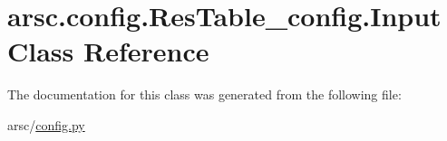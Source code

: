 \hypertarget{classarsc_1_1config_1_1ResTable__config_1_1Input}{}\section{arsc.\+config.\+Res\+Table\+\_\+config.\+Input Class Reference}
\label{classarsc_1_1config_1_1ResTable__config_1_1Input}


The documentation for this class was generated from the following file\+:\begin{DoxyCompactItemize}
\item 
arsc/\mbox{\hyperlink{config_8py}{config.\+py}}\end{DoxyCompactItemize}
